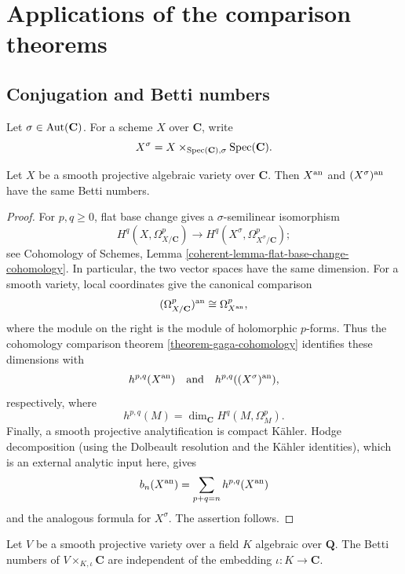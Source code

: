 \section{Applications of the comparison theorems}
\label{section-gaga-applications}

\subsection{Conjugation and Betti numbers}
\label{subsection-gaga-betti-numbers}

Let $\sigma\in\mathop{\rm Aut}(\mathbf C)$. For a scheme $X$ over
$\mathbf C$, write
$$
X^\sigma=X\times_{\mathop{\rm Spec}(\mathbf C),\sigma}
\mathop{\rm Spec}(\mathbf C).
$$

\begin{proposition}
\label{proposition-conjugate-smooth-projective-betti-numbers}
\begin{reference}
\cite[\S 4, no. 18, Proposition 12]{GAGA}
\end{reference}
Let $X$ be a smooth projective algebraic variety over $\mathbf C$. Then $X^{\rm an}$
and $(X^\sigma)^{\rm an}$ have the same Betti numbers.
\end{proposition}

\begin{proof}
For $p,q\geq 0$, flat base change gives a $\sigma$-semilinear
isomorphism
$$
H^q(X,\Omega^p_{X/\mathbf C})
\longrightarrow
H^q(X^\sigma,\Omega^p_{X^\sigma/\mathbf C});
$$
see Cohomology of Schemes, Lemma
\ref{coherent-lemma-flat-base-change-cohomology}. In particular, the two
vector spaces have the same dimension. For a smooth variety, local
coordinates give the canonical comparison
$$
(\Omega^p_{X/\mathbf C})^{\rm an}
\cong \Omega^p_{X^{\rm an}},
$$
where the module on the right is the module of holomorphic $p$-forms. Thus
the cohomology comparison theorem \ref{theorem-gaga-cohomology} identifies
these dimensions with
$$
h^{p,q}(X^{\rm an})
\quad\hbox{and}\quad
h^{p,q}((X^\sigma)^{\rm an}),
$$
respectively, where
$$
h^{p,q}(M)=\dim_{\mathbf C}H^q(M,\Omega^p_M).
$$
Finally, a smooth projective analytification is compact K\"ahler. Hodge
decomposition (using the Dolbeault resolution and the K\"ahler identities),
which is an external analytic input here, gives
$$
b_n(X^{\rm an})=\sum_{p+q=n}h^{p,q}(X^{\rm an})
$$
and the analogous formula for $X^\sigma$. The assertion follows.
\end{proof}

\begin{proposition}[Corollary]
\label{corollary-number-field-embeddings-betti-numbers}
\begin{reference}
\cite[\S 4, no. 18, corollary to Proposition 12]{GAGA}
\end{reference}
Let $V$ be a smooth projective variety over a field $K$ algebraic over
$\mathbf Q$. The Betti
numbers of $V\times_{K,\iota}\mathbf C$ are independent of the embedding
$\iota:K\longrightarrow\mathbf C$.
\end{proposition}

